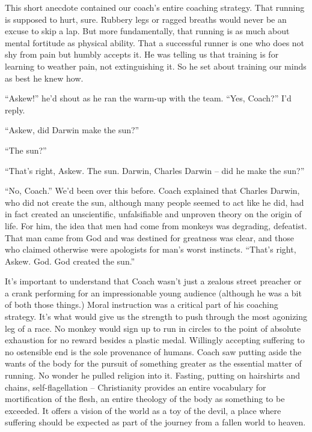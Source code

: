 \documentclass[12pt, oneside]{memoir}
\begin{document}
This short anecdote contained our coach's entire coaching strategy.
That running is supposed to hurt, sure.
Rubbery legs or ragged breaths would never be an excuse to skip a lap.
But more fundamentally, that running is as much about mental
fortitude as physical ability.
That a successful runner is one who does not shy from pain but humbly
accepts it.
He was telling us that training is for learning to weather pain, not
extinguishing it.
So he set about training our minds as best he knew how.

``Askew!'' he'd shout as he ran the warm-up with the team.
``Yes, Coach?'' I'd reply.

``Askew, did Darwin make the sun?''

``The sun?''

``That's right, Askew. The sun. Darwin, Charles Darwin -- did he make
the sun?''

``No, Coach.'' We'd been over this before.
Coach explained that Charles Darwin, who did not create the sun,
although many people seemed to act like he did, had in fact created an
unscientific, unfalsifiable and unproven theory on the origin of life.
For him, the idea that men had come from monkeys was degrading,
defeatist.
That man came from God and was destined for greatness was clear, and
those who claimed otherwise were apologists for man's worst instincts.
``That's right, Askew. God. God created the sun.''

It's important to understand that Coach wasn't just a zealous street
preacher or a crank performing for an impressionable young audience
(although he was a bit of both those things.)
Moral instruction was a critical part of his coaching strategy.
It's what would give us the strength to push through the most
agonizing leg of a race.
No monkey would sign up to run in circles to the point of absolute
exhaustion for no reward besides a plastic medal.
Willingly accepting suffering to no ostensible end is the sole
provenance of humans.
Coach saw putting aside the wants of the body for the pursuit of
something greater as the essential matter of running.
No wonder he pulled religion into it.
Fasting, putting on hairshirts and chains, self-flagellation --
Christianity provides an entire vocabulary for mortification of the
flesh, an entire theology of the body as something to be exceeded.
It offers a vision of the world as a toy of the devil, a place where
suffering should be expected as part of the journey from a fallen
world to heaven.
\end{document}
